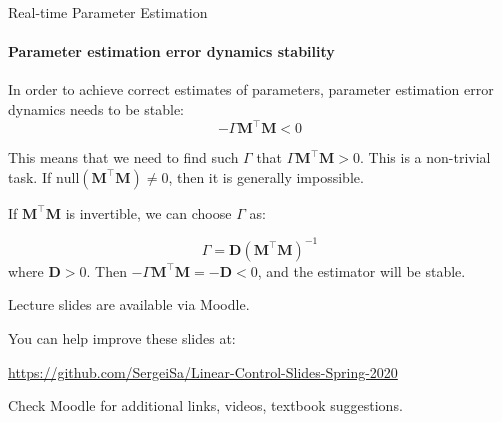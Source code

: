 \documentclass{beamer}
\begin{document}
\begin{frame}{Real-time Parameter Estimation}
\framesubtitle{Parameter estimation error dynamics stability}
\begin{flushleft}

In order to achieve correct estimates of parameters, parameter estimation error dynamics needs to be stable:
\[
- \Gamma \mathbf M^\top \mathbf M  < 0
\]

This means that we need to find such $\Gamma$ that $\Gamma \mathbf M^\top \mathbf M > 0$. This is a non-trivial task. If $\text{null} (\mathbf M^\top \mathbf M)  \neq 0$, then it is generally impossible.

\bigskip

If $\mathbf M^\top \mathbf M$ is invertible, we can choose $\Gamma$ as:

\[
\Gamma = \mathbf D (\mathbf M^\top \mathbf M)^{-1}
\]
%
where $\mathbf D > 0$. Then $-\Gamma \mathbf M^\top \mathbf M = -\mathbf D  < 0$, and the estimator will be stable.

\end{flushleft}
\end{frame}




\begin{frame}
\centerline{Lecture slides are available via Moodle.}
\bigskip
\centerline{You can help improve these slides at:}
\centerline{\url{https://github.com/SergeiSa/Linear-Control-Slides-Spring-2020}}
\bigskip
\centerline{Check Moodle for additional links, videos, textbook suggestions.}
\end{frame}
\end{document}
